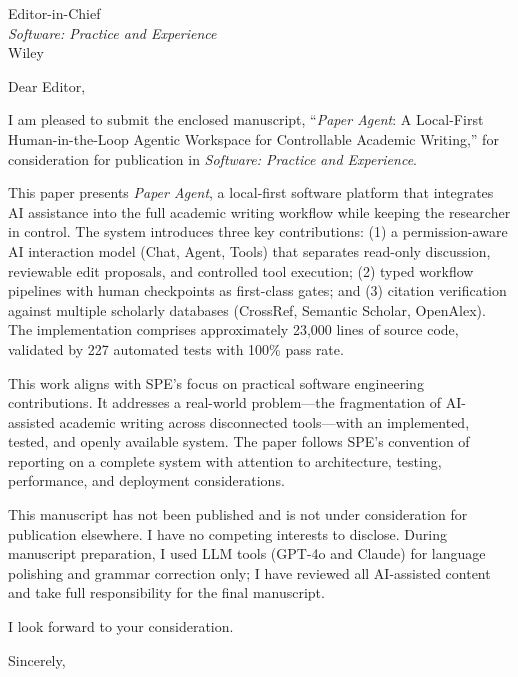 \documentclass[11pt]{letter}
\date{\today}
\begin{document}
\begin{letter}{Editor-in-Chief\\
\textit{Software: Practice and Experience}\\
Wiley}

\opening{Dear Editor,}

I am pleased to submit the enclosed manuscript, ``\textit{Paper Agent}: A
Local-First Human-in-the-Loop Agentic Workspace for Controllable Academic
Writing,'' for consideration for publication in \textit{Software: Practice
and Experience}.

This paper presents \textit{Paper Agent}, a local-first software platform
that integrates AI assistance into the full academic writing workflow while
keeping the researcher in control. The system introduces three key
contributions: (1) a permission-aware AI interaction model (Chat, Agent,
Tools) that separates read-only discussion, reviewable edit proposals, and
controlled tool execution; (2) typed workflow pipelines with human
checkpoints as first-class gates; and (3) citation verification against
multiple scholarly databases (CrossRef, Semantic Scholar, OpenAlex). The
implementation comprises approximately 23,000 lines of source code,
validated by 227 automated tests with 100\% pass rate.

This work aligns with SPE's focus on practical software engineering
contributions. It addresses a real-world problem---the fragmentation of
AI-assisted academic writing across disconnected tools---with an implemented,
tested, and openly available system. The paper follows SPE's convention of
reporting on a complete system with attention to architecture, testing,
performance, and deployment considerations.

This manuscript has not been published and is not under consideration for
publication elsewhere. I have no competing interests to disclose. During
manuscript preparation, I used LLM tools (GPT-4o and Claude) for language
polishing and grammar correction only; I have reviewed all AI-assisted
content and take full responsibility for the final manuscript.

I look forward to your consideration.

\closing{Sincerely,}

\end{letter}
\end{document}
